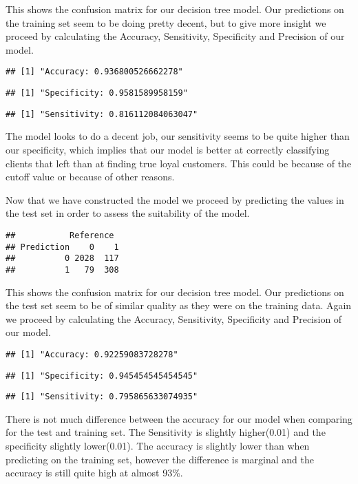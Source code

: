 \documentclass[
]{article}
\begin{document}
This shows the confusion matrix for our decision tree model. Our
predictions on the training set seem to be doing pretty decent, but to
give more insight we proceed by calculating the Accuracy, Sensitivity,
Specificity and Precision of our model.

\begin{verbatim}
## [1] "Accuracy: 0.936800526662278"
\end{verbatim}

\begin{verbatim}
## [1] "Specificity: 0.9581589958159"
\end{verbatim}

\begin{verbatim}
## [1] "Sensitivity: 0.816112084063047"
\end{verbatim}

The model looks to do a decent job, our sensitivity seems to be quite
higher than our specificity, which implies that our model is better at
correctly classifying clients that left than at finding true loyal
customers. This could be because of the cutoff value or because of other
reasons.

Now that we have constructed the model we proceed by predicting the
values in the test set in order to assess the suitability of the model.

\begin{verbatim}
##           Reference
## Prediction    0    1
##          0 2028  117
##          1   79  308
\end{verbatim}

This shows the confusion matrix for our decision tree model. Our
predictions on the test set seem to be of similar quality as they were
on the training data. Again we proceed by calculating the Accuracy,
Sensitivity, Specificity and Precision of our model.

\begin{verbatim}
## [1] "Accuracy: 0.92259083728278"
\end{verbatim}

\begin{verbatim}
## [1] "Specificity: 0.945454545454545"
\end{verbatim}

\begin{verbatim}
## [1] "Sensitivity: 0.795865633074935"
\end{verbatim}

There is not much difference between the accuracy for our model when
comparing for the test and training set. The Sensitivity is slightly
higher(0.01) and the specificity slightly lower(0.01). The accuracy is
slightly lower than when predicting on the training set, however the
difference is marginal and the accuracy is still quite high at almost
93\%.
\end{document}

